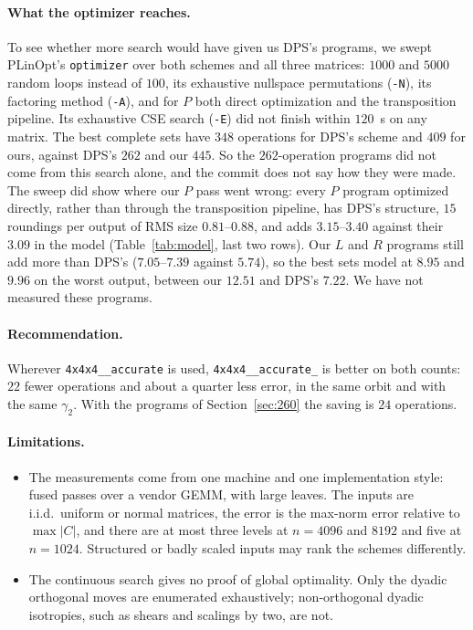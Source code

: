 \documentclass[11pt]{article}
\theoremstyle{remark}
\newcommand{\acc}{\texttt{4x4x4\_\allowbreak 48\_\allowbreak accurate}\xspace}
\newcommand{\acct}{\texttt{4x4x4\_\allowbreak 48\_\allowbreak accurate\_\allowbreak 262}\xspace}
\begin{document}
\paragraph{What the optimizer reaches.}
To see whether more search would have given us DPS's programs, we swept
PLinOpt's \texttt{optimizer} over both schemes and all three matrices:
$1000$ and $5000$ random loops instead of $100$, its exhaustive
nullspace permutations (\texttt{-N}), its factoring method (\texttt{-A}),
and for $P$ both direct optimization and the transposition pipeline.
Its exhaustive CSE search (\texttt{-E}) did not finish within $120$~s on
any matrix.  The best complete sets have $348$ operations for DPS's
scheme and $409$ for ours, against DPS's $262$ and our $445$.  So the
$262$-operation programs did not come from this search alone, and the
commit does not say how they were made.  The sweep did show where our
$P$ pass went wrong: every $P$ program optimized directly, rather than
through the transposition pipeline, has DPS's structure, $15$ roundings
per output of RMS size $0.81$--$0.88$, and adds $3.15$--$3.40$ against
their $3.09$ in the model (Table~\ref{tab:model}, last two rows).  Our
$L$ and $R$ programs still add more than DPS's ($7.05$--$7.39$ against
$5.74$), so the best sets model at $8.95$ and $9.96$ on the worst
output, between our $12.51$ and DPS's $7.22$.  We have not measured
these programs.

\paragraph{Recommendation.}
Wherever \acc is used, \acct is
better on both counts: $22$ fewer operations and about a quarter less
error, in the same orbit and with the same $\gamma_2$.  With the programs
of Section~\ref{sec:260} the saving is $24$ operations.

\paragraph{Limitations.}
\begin{itemize}
\item The measurements come from one machine and one implementation
  style: fused passes over a vendor GEMM, with large leaves.  The inputs
  are i.i.d.\ uniform or normal matrices, the error is the max-norm error
  relative to $\max\lvert C\rvert$, and there are at most three levels
  at $n=4096$ and $8192$ and five at $n=1024$.  Structured or badly scaled inputs may rank the
  schemes differently.
\item The continuous search gives no proof of global optimality.  Only
  the dyadic orthogonal moves are enumerated exhaustively;
  non-orthogonal dyadic isotropies, such as shears and scalings by two,
  are not.
\end{itemize}
\end{document}
